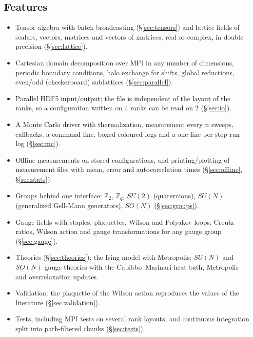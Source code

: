 \documentclass[11pt]{article}
\begin{document}
\subsection{Features}
\begin{itemize}
  \item Tensor algebra with batch broadcasting (\S\ref{sec:tensors}) and lattice fields of scalars, vectors, matrices and vectors
        of matrices, real or complex, in double precision (\S\ref{sec:lattice}).
  \item Cartesian domain decomposition over MPI in any number of dimensions, periodic boundary conditions, halo exchange for shifts,
        global reductions, even/odd (checkerboard) sublattices (\S\ref{sec:parallel}).
  \item Parallel HDF5 input/output; the file is independent of the layout of the ranks, so a configuration written on $4$ ranks
        can be read on $2$ (\S\ref{sec:io}).
  \item A Monte Carlo driver with thermalization, measurement every $n$ sweeps, callbacks, a command line, boxed coloured logs and
        a one-line-per-step run log (\S\ref{sec:mc}).
  \item Offline measurements on stored configurations, and printing/plotting of measurement files with mean, error and
        autocorrelation times (\S\ref{sec:offline}, \S\ref{sec:stats}).
  \item Groups behind one interface: $\mathbb{Z}_2$, $\mathbb{Z}_q$, $SU(2)$ (quaternions), $SU(N)$ (generalized Gell-Mann
        generators), $SO(N)$ (\S\ref{sec:groups}).
  \item Gauge fields with staples, plaquettes, Wilson and Polyakov loops, Creutz ratios, Wilson action and gauge transformations
        for any gauge group (\S\ref{sec:gauge}).
  \item Theories (\S\ref{sec:theories}): the Ising model with Metropolis; $SU(N)$ and $SO(N)$ gauge theories with the
        Cabibbo--Marinari heat bath, Metropolis and overrelaxation updates.
  \item Validation: the plaquette of the Wilson action reproduces the values of the literature (\S\ref{sec:validation}).
  \item Tests, including MPI tests on several rank layouts, and continuous integration split into path-filtered chunks
        (\S\ref{sec:tests}).
\end{itemize}
\end{document}
